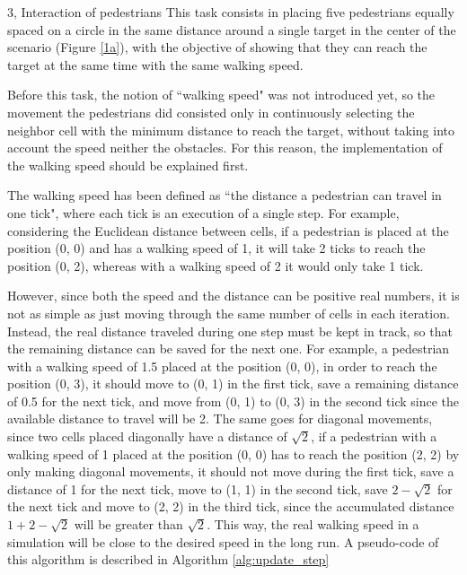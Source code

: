 \documentclass[10pt,a4paper]{article}
\begin{document}
\begin{task}{3, Interaction of pedestrians}
This task consists in placing five pedestrians equally spaced on a circle in the same distance around a single target in the center of the scenario (Figure \ref{1a}), with the objective of showing that they can reach the target at the same time with the same walking speed.

Before this task, the notion of ``walking speed" was not introduced yet, so the movement the pedestrians did consisted only in continuously selecting the neighbor cell with the minimum distance to reach the target, without taking into account the speed neither the obstacles. For this reason, the implementation of the walking speed should be explained first.

The walking speed has been defined as ``the distance a pedestrian can travel in one tick", where each tick is an execution of a single step. For example, considering the Euclidean distance between cells, if a pedestrian is placed at the position (0, 0) and has a walking speed of 1, it will take 2 ticks to reach the position (0, 2), whereas with a walking speed of 2 it would only take 1 tick.

However, since both the speed and the distance can be positive real numbers, it is not as simple as just moving through the same number of cells in each iteration. Instead, the real distance traveled during one step must be kept in track, so that the remaining distance can be saved for the next one. For example, a pedestrian with a walking speed of 1.5 placed at the position (0, 0), in order to reach the position (0, 3), it should move to (0, 1) in the first tick, save a remaining distance of 0.5 for the next tick, and move from (0, 1) to (0, 3) in the second tick since the available distance to travel will be 2. The same goes for diagonal movements, since two cells placed diagonally have a distance of $\sqrt{2}$, if a pedestrian with a walking speed of 1 placed at the position (0, 0) has to reach the position (2, 2) by only making diagonal movements, it should not move during the first tick, save a distance of 1 for the next tick, move to (1, 1) in the second tick, save $2-\sqrt{2}$ for the next tick and move to (2, 2) in the third tick, since the accumulated distance $1+2-\sqrt{2}$ will be greater than $\sqrt{2}$. This way, the real walking speed in a simulation will be close to the desired speed in the long run. A pseudo-code of this algorithm is described in Algorithm \ref{alg:update_step}


\end{task}
\end{document}
